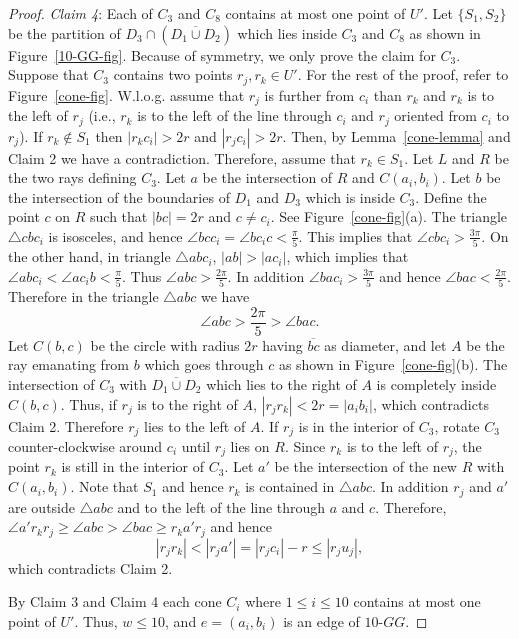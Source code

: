\documentclass[11pt,a4paper]{article}
\newcommand{\kGG}[2]{$#1\text{-}GG#2$}
\newcommand{\CIRC}[2]{C(#1,#2)}
\begin{document}
\begin{proof}
{\em Claim 4}: Each of $C_3$ and $C_8$ contains at most one point of $U'$. Let $\{S_1,S_2\}$ be the partition of $D_3\cap (\overline{D_1\cup D_2})$ which lies inside $C_3$ and $C_8$ as shown in Figure~\ref{10-GG-fig}. Because of symmetry, we only prove the claim for $C_3$. Suppose that $C_3$ contains two points $r_j, r_k \in U'$.
For the rest of the proof, refer to Figure~\ref{cone-fig}. 
W.l.o.g. assume that $r_j$ is further from $c_i$ than $r_k$ and $r_k$ is to the left of $r_j$ (i.e., $r_k$ is to the left of the line through
$c_i$ and $r_j$ oriented from $c_i$ to $r_j$). If $r_k\notin S_1$ then $|r_kc_i|>2r$ and $|r_jc_i|>2r$. Then, by Lemma~\ref{cone-lemma} and Claim 2 we have a contradiction. Therefore, assume that $r_k\in S_1$. Let $L$ and $R$ be the two rays defining $C_3$. Let $a$ be the intersection of $R$ and $\CIRC{a_i}{b_i}$. Let $b$ be the intersection of the boundaries of $D_1$ and $D_3$ which is inside $C_3$. Define the point $c$ on $R$ such that $|bc|=2r$ and $c\neq c_i$. See Figure~\ref{cone-fig}(a). The triangle $\bigtriangleup cbc_i$ is isosceles, and hence $\angle bcc_i = \angle bc_ic <\frac{\pi}{5}$. This implies that $\angle cbc_i>\frac{3\pi}{5}$. On the other hand, in triangle $\bigtriangleup abc_i$, $|ab|>|ac_i|$, which implies that $\angle abc_i <\angle ac_ib<\frac{\pi}{5}$. Thus $\angle abc >\frac{2\pi}{5}$. In addition $\angle bac_i>\frac{3\pi}{5}$ and hence $\angle bac < \frac{2\pi}{5}$. Therefore in the triangle $\bigtriangleup abc$ we have $$\angle abc>\frac{2\pi}{5}>\angle bac.$$ Let $C(b,c)$ be the circle with radius $2r$ having $\overline{bc}$ as diameter, and let $A$ be the ray emanating from $b$ which goes through $c$ as shown in Figure~\ref{cone-fig}(b). The intersection of $C_3$ with $\overline{D_1\cup D_2}$ which lies to the right of $A$ is completely inside $C(b,c)$. Thus, if $r_j$ is to the right of $A$, $|r_jr_k|<\allowbreak 2r\allowbreak =\allowbreak |a_ib_i|$, which contradicts Claim 2. Therefore $r_j$ lies to the left of $A$. If $r_j$ is in the interior of $C_3$, rotate $C_3$ counter-clockwise around $c_i$ until $r_j$ lies on $R$. Since $r_k$ is to the left of $r_j$, the point $r_k$ is still in the interior of $C_3$. Let $a'$ be the intersection of the new $R$ with $\CIRC{a_i}{b_i}$. Note that $S_1$ and hence $r_k$ is contained in $\bigtriangleup abc$. In addition $r_j$ and $a'$ are outside $\bigtriangleup abc$ and to the left of the line through $a$ and $c$. Therefore, $\angle a'r_kr_j\ge \angle abc >\angle bac \ge r_ka'r_j$ and hence $$|r_jr_k|<|r_ja'|=|r_jc_i|-r\le |r_ju_j|,$$ which contradicts Claim 2. 

By Claim 3 and Claim 4 each cone $C_i$ where $1\le i \le 10$ contains at most one point of $U'$. Thus, $w\le 10$, and $e=(a_i,b_i)$ is an edge of \kGG{10}{}.
\end{proof}
\end{document}
